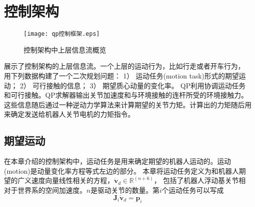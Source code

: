 \section{控制架构}
\label{sec:controller}
\begin{figure}[htbp]
    \centering
    \texttt{[image: qp控制框架.eps]}
    \caption{\label{fig:framework_control_flow}控制架构中上层信息流概览}
\end{figure}
展示了控制架构的上层信息流。一个上层的运动行为，比如行走或者开车行为，
用下列数据构建了一个二次规划问题：
1）	运动任务(motion task)形式的期望运动；
2）	可行接触的信息；
3）	期望质心动量的变化率。
QP利用协调运动任务和可行接触。QP求解器输出关节加速度和与环境接触的连杆所受的环境接触力。
这些信息随后通过一种逆动力学算法来计算期望的关节力矩。计算出的力矩随后用来确定发送给机器人关节电机的力矩指令。
\subsection{期望运动}
在本章介绍的控制架构中，运动任务是用来确定期望的机器人运动的。运动(motion)是动量变化率方程等式左边的部分。
本章将运动任务定义为和机器人期望的广义速度向量线性相关的方程，${\dot{\boldsymbol{v}}}_{d}\in {\mathbb{R}}^{(n+6)}$，
包括了机器人浮动基关节相对于世界系的空间加速度。$n$是驱动关节的数量。第$i$个运动任务可以写成
\begin{equation}
    \label{equ:motion_task}
    \boldsymbol{J}_i \dot {\boldsymbol{v}}_d = \boldsymbol{p}_i
\end{equation}
